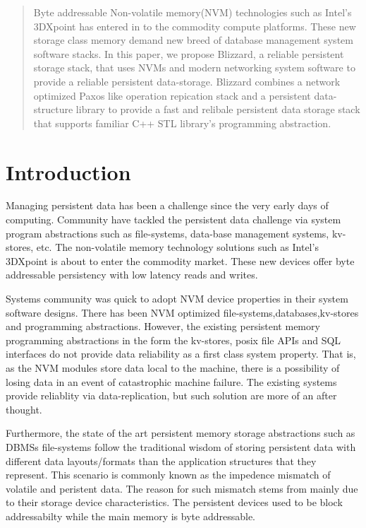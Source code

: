 \begin{abstract}
	Byte addressable Non-volatile memory(NVM) technologies such as Intel's
	3DXpoint has entered in to the commodity compute platforms. These
	new storage class memory demand new breed of database management system 
	software stacks. 
	In this paper, we propose Blizzard, a reliable persistent storage stack,
	that uses NVMs and modern networking system software to provide a reliable
	persistent data-storage. Blizzard combines a network optimized Paxos like 
	operation repication stack and a persistent data-structure library to 
	provide a fast and relibale persistent data storage stack that supports
	familiar C++ STL library's programming abstraction.

\end{abstract}

\section{Introduction}

Managing persistent data has been a challenge since the very early days of computing.
Community have tackled the persistent data challenge via system program abstractions
such as file-systems, data-base management systems, kv-stores, etc.
The non-volatile memory technology solutions such as Intel's 3DXpoint is about to
enter the commodity market. These new devices offer byte addressable persistency
with low latency reads and writes.

Systems community was quick to adopt NVM device properties in their system software
designs. There has been NVM optimized file-systems,databases,kv-stores and programming abstractions.
However, the existing persistent memory programming abstractions in the form the kv-stores, posix 
file APIs and SQL interfaces do not provide data reliability as a first class system
property. That is, as the NVM modules store data local to the machine, there is a possibility of 
losing data in an event of catastrophic machine failure. The existing systems provide reliablity
via data-replication, but such solution are more of an after thought.

Furthermore, the state of the art persistent memory storage abstractions such as DBMSs file-systems
follow the traditional wisdom of storing persistent data with different data layouts/formats
than the application structures that they represent. This scenario is commonly known as 
the impedence mismatch of volatile and peristent data. The reason for such mismatch stems 
from mainly due to their storage device characteristics. The persistent devices used to be
block addressabilty while the main memory is byte addressable.


